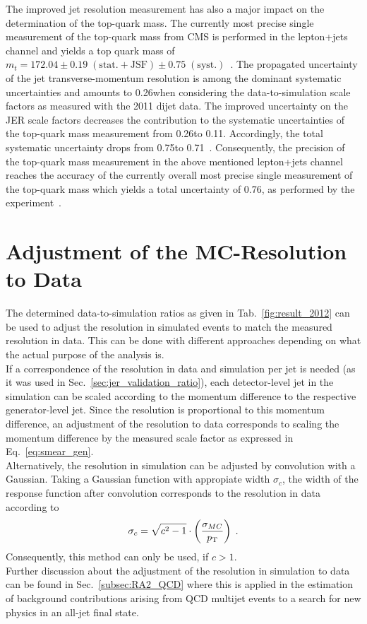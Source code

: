 The improved jet resolution measurement has also a major impact on the determination of the top-quark mass. The currently most precise single measurement of the top-quark mass from CMS is performed in the lepton+jets channel and yields a top quark mass of $m_t = 172.04 \pm 0.19\; \mathrm{(stat.+JSF)} \pm 0.75\;\mathrm{(syst.)}$\gev~\cite{CMS-PAS-TOP-14-001}. The propagated uncertainty of the jet transverse-momentum resolution is among the dominant systematic uncertainties and amounts to 0.26\gev when considering the data-to-simulation scale factors as measured with the 2011 dijet data. The improved uncertainty on the JER scale factors decreases the contribution to the systematic uncertainties of the top-quark mass measurement from 0.26\gev to 0.11\gev. Accordingly, the total systematic uncertainty drops from 0.75\gev to 0.71\gev~\cite{MSeidel}. Consequently, the precision of the top-quark mass measurement in the above mentioned lepton+jets channel reaches the accuracy of the currently overall most precise single measurement of the top-quark mass which yields a total uncertainty of 0.76\gev, as performed by the \dzero experiment~\cite{Abazov:2014dpa}.   

\section{Adjustment of the MC-Resolution to Data}
\label{sec:jer_adjustment}
The determined data-to-simulation ratios as given in Tab.~\ref{fig:result_2012} can be used to adjust the resolution in simulated events to match the measured resolution in data. This can be done with different approaches depending on what the actual purpose of the analysis is. \\
If a correspondence of the resolution in data and simulation per jet is needed (as it was used in Sec.~\ref{sec:jer_validation_ratio}), each detector-level jet in the simulation can be scaled according to the momentum difference to the respective generator-level jet. Since the resolution is proportional to this momentum difference, an adjustment of the resolution to data corresponds to scaling the momentum difference by the measured scale factor as expressed in Eq.~\ref{eq:smear_gen}. \\
Alternatively, the resolution in simulation can be adjusted by convolution with a Gaussian. Taking a Gaussian function with appropiate width $\sigma_{c}$, the width of the response function after convolution corresponds to the resolution in data according to 
\begin{equation}
\sigma_{c} = \sqrt{c^2-1} \cdot \left( \frac{\sigma_{MC}}{p_{\text{T}}} \right) \; .
\label{eq:res_adjust}
\end{equation}
Consequently, this method can only be used, if $c > 1$. \\
Further discussion about the adjustment of the resolution in simulation to data can be found in Sec.~\ref{subsec:RA2_QCD} where this is applied in the estimation of background contributions arising from QCD multijet events to a search for new physics in an all-jet final state.  













